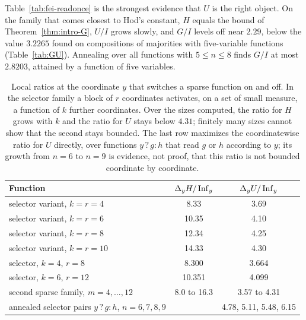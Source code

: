 Table~\ref{tab:fei-readonce} is the strongest evidence that $U$ is the right object. On the family that comes closest to Hod's constant, $H$ equals the bound of Theorem~\ref{thm:intro-G}, $U/I$ grows slowly, and $G/I$ levels off near $2.29$, below the value $3.2265$ found on compositions of majorities with five-variable functions (Table~\ref{tab:GU}). Annealing over all functions with $5\le n\le8$ finds $G/I$ at most $2.8203$, attained by a function of five variables.

\begin{table}[ht]
\centering\small
\begin{tabular}{lcc}
\toprule
Function & $\Delta_yH/\operatorname{Inf}_y$ & $\Delta_yU/\operatorname{Inf}_y$\\
\midrule
selector variant, $k=r=4$ & 8.33 & 3.69\\
selector variant, $k=r=6$ & 10.35 & 4.10\\
selector variant, $k=r=8$ & 12.34 & 4.25\\
selector variant, $k=r=10$ & 14.33 & 4.30\\
selector, $k=4$, $r=8$ & 8.300 & 3.664\\
selector, $k=6$, $r=12$ & 10.351 & 4.099\\
second sparse family, $m=4,\dots,12$ & 8.0 to 16.3 & 3.57 to 4.31\\
\midrule
annealed selector pairs $y\,?\,g:h$, $n=6,7,8,9$ & & 4.78, 5.11, 5.48, 6.15\\
\bottomrule
\end{tabular}
\caption{Local ratios at the coordinate $y$ that switches a sparse function on and off. In the selector family a block of $r$ coordinates activates, on a set of small measure, a function of $k$ further coordinates. Over the sizes computed, the ratio for $H$ grows with $k$ and the ratio for $U$ stays below $4.31$; finitely many sizes cannot show that the second stays bounded. The last row maximizes the coordinatewise ratio for $U$ directly, over functions $y\,?\,g:h$ that read $g$ or $h$ according to $y$; its growth from $n=6$ to $n=9$ is evidence, not proof, that this ratio is not bounded coordinate by coordinate.}
\label{tab:fei-local}
\end{table}

